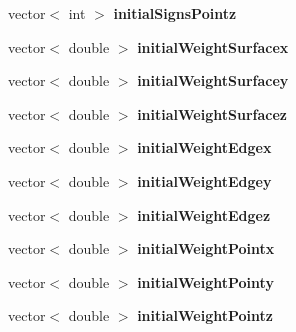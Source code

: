 \begin{DoxyCompactItemize}
\item 
\hypertarget{classSimulation_aaae5a25e7b09636908534e6adbec0464}{}vector$<$ int $>$ {\bfseries initial\+Signs\+Pointz}\label{classSimulation_aaae5a25e7b09636908534e6adbec0464}

\item 
\hypertarget{classSimulation_a81f1b2547073fb6abd63d39d00eb0c3c}{}vector$<$ double $>$ {\bfseries initial\+Weight\+Surfacex}\label{classSimulation_a81f1b2547073fb6abd63d39d00eb0c3c}

\item 
\hypertarget{classSimulation_a03a1bbd006e3cc02b41ccd23fc883254}{}vector$<$ double $>$ {\bfseries initial\+Weight\+Surfacey}\label{classSimulation_a03a1bbd006e3cc02b41ccd23fc883254}

\item 
\hypertarget{classSimulation_ae9856992125aab67355a3ca1033ed46f}{}vector$<$ double $>$ {\bfseries initial\+Weight\+Surfacez}\label{classSimulation_ae9856992125aab67355a3ca1033ed46f}

\item 
\hypertarget{classSimulation_aef3f9aac298fbd7840e143c67d91e30c}{}vector$<$ double $>$ {\bfseries initial\+Weight\+Edgex}\label{classSimulation_aef3f9aac298fbd7840e143c67d91e30c}

\item 
\hypertarget{classSimulation_a94872d7ede013c3916f5beeb9bf7baf5}{}vector$<$ double $>$ {\bfseries initial\+Weight\+Edgey}\label{classSimulation_a94872d7ede013c3916f5beeb9bf7baf5}

\item 
\hypertarget{classSimulation_a4d8f51721428fccfb1cd32de46b1d0bf}{}vector$<$ double $>$ {\bfseries initial\+Weight\+Edgez}\label{classSimulation_a4d8f51721428fccfb1cd32de46b1d0bf}

\item 
\hypertarget{classSimulation_a5729bbbf97bb6870254c7f2bd55d5e55}{}vector$<$ double $>$ {\bfseries initial\+Weight\+Pointx}\label{classSimulation_a5729bbbf97bb6870254c7f2bd55d5e55}

\item 
\hypertarget{classSimulation_a27a788f83ff23d792139cd59ce56686d}{}vector$<$ double $>$ {\bfseries initial\+Weight\+Pointy}\label{classSimulation_a27a788f83ff23d792139cd59ce56686d}

\item 
\hypertarget{classSimulation_abb673b86b72a2f3924b1c011865bbbcd}{}vector$<$ double $>$ {\bfseries initial\+Weight\+Pointz}\label{classSimulation_abb673b86b72a2f3924b1c011865bbbcd}


\end{DoxyCompactItemize}
